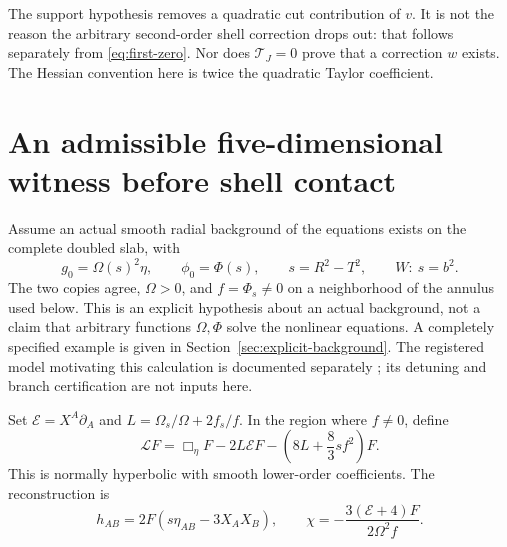 \documentclass[11pt]{article}
\theoremstyle{remark}
\begin{document}
The support hypothesis removes a quadratic cut contribution of $v$.
It is not the reason the arbitrary second-order shell correction drops
out: that follows separately from \eqref{eq:first-zero}. Nor does
$\mathcal T_J=0$ prove that a correction $w$ exists. The Hessian convention
here is twice the quadratic Taylor coefficient.

\section{An admissible five-dimensional witness before shell contact}
\label{sec:witness}

Assume an actual smooth radial background of the equations exists on the
complete doubled slab, with
\begin{equation}
 g_0=\Omega(s)^2\eta,\qquad \phi_0=\Phi(s),\qquad
 s=R^2-T^2,\qquad W:\ s=b^2.
 \label{eq:background}
\end{equation}
The two copies agree, $\Omega>0$, and $f=\Phi_s\ne0$ on a neighborhood
of the annulus used below. This is an explicit hypothesis about an actual
background, not a claim that arbitrary functions $\Omega,\Phi$ solve the
nonlinear equations. A completely specified example is given in
Section~\ref{sec:explicit-background}. The registered model motivating
this calculation is documented separately \cite{MaldonadoShell2026};
its detuning and branch certification are not inputs here.

Set $\mathcal E=X^A\partial_A$ and
$L=\Omega_s/\Omega+2f_s/f$. In the region where $f\ne0$, define
\begin{equation}
 \mathscr L F=\Box_\eta F-2L\mathcal E F
       -\left(8L+\frac83sf^2\right)F.
 \label{eq:master}
\end{equation}
This is normally hyperbolic with smooth lower-order coefficients. The
reconstruction is
\begin{equation}
 h_{AB}=2F(s\eta_{AB}-3X_AX_B),\qquad
 \chi=-\frac{3(\mathcal E+4)F}{2\Omega^2f}.
 \label{eq:reconstruction}
\end{equation}
\end{document}
